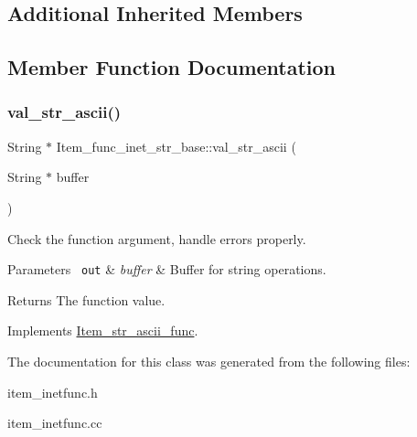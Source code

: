 \subsection*{Additional Inherited Members}


\subsection{Member Function Documentation}
\mbox{\label{classItem__func__inet__str__base_a264e8d2eb93e0b94b3fa195fb5540aa3}} 
\subsubsection{\texorpdfstring{val\+\_\+str\+\_\+ascii()}{val\_str\_ascii()}}
{\footnotesize\ttfamily String $\ast$ Item\+\_\+func\+\_\+inet\+\_\+str\+\_\+base\+::val\+\_\+str\+\_\+ascii (\begin{DoxyParamCaption}\item[{String $\ast$}]{buffer }\end{DoxyParamCaption})\hspace{0.3cm}{\ttfamily [virtual]}}

Check the function argument, handle errors properly.


\begin{DoxyParams}[1]{Parameters}
\mbox{\texttt{ out}}  & {\em buffer} & Buffer for string operations.\\
\hline
\end{DoxyParams}
\begin{DoxyReturn}{Returns}
The function value. 
\end{DoxyReturn}


Implements \mbox{\hyperlink{classItem__str__ascii__func}{Item\+\_\+str\+\_\+ascii\+\_\+func}}.



The documentation for this class was generated from the following files\+:\begin{DoxyCompactItemize}
\item 
item\+\_\+inetfunc.\+h\item 
item\+\_\+inetfunc.\+cc\end{DoxyCompactItemize}
